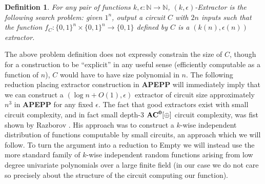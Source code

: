 \documentclass[11pt]{article}
\newtheorem{definition}{Definition}
\def\cl{\bf}
\begin{document}
\begin{definition}
For any pair of functions $k, \epsilon: \mathbb{N} \rightarrow \mathbb{N}$, {\sc $(k,\epsilon)$-Extractor} is the following search problem: given $1^n$, output a circuit $C$ with $2n$ inputs such that the function $f_C: \{0,1\}^n \times \{0,1\}^n \rightarrow \{0,1\}$ defined by $C$ is a $(k(n),\epsilon(n))$ extractor.
\end{definition}

The above problem definition does not expressly constrain the size of $C$, though for a construction to be ``explicit'' in any useful sense (efficiently computable as a function of $n$), $C$ would have to have size polynomial in $n$. The following reduction placing extractor construction in {\cl APEPP} will immediately imply that we can construct a $(\log n + O(1), \epsilon)$ extractor of circuit size approximately $n^3$ in {\cl APEPP} for any fixed $\epsilon$. The fact that good extractors exist with small circuit complexity, and in fact small depth-3 $\cl{AC}^0[\oplus]$ circuit complexity, was fist shown by Razborov \cite{razborov-ramsey}. His approach was to construct a $k$-wise independent distribution of functions computable by small circuits, an approach which we will follow. To turn the argument into a reduction to {\sc Empty} we will instead use the more standard family of $k$-wise independent random functions arising from low degree univariate polynomials over a large finite field (in our case we do not care so precisely about the structure of the circuit computing our function).
\end{document}
